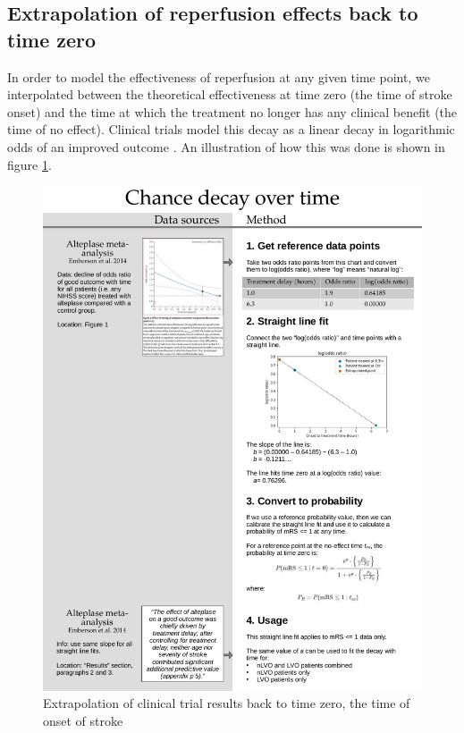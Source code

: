 \subsection{Extrapolation of reperfusion effects back to time zero}

In order to model the effectiveness of reperfusion at any given time point, we interpolated between the theoretical effectiveness at time zero (the time of stroke onset) and the time at which the treatment no longer has any clinical benefit (the time of no effect). Clinical trials model this decay as a linear decay in logarithmic odds of an improved outcome \cite{emberson_effect_2014, fransen_time_2016}. An illustration of how this was done is shown in figure \ref{fig:decay}.

\begin{figure}[h!]
    \centering
    \includegraphics[width=1.0\linewidth]{images_modelling/data_sources_decay.png}
    \caption{Extrapolation of clinical trial results back to time zero, the time of onset of stroke}
    \label{fig:decay}
\end{figure}


